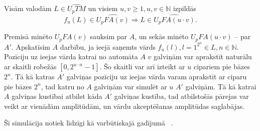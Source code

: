 \documentclass{ludis}
\begin{document}
\begin{lemma} \label{reizinajums}
Visām valodām $L \in \widehat{U_pTM}$ un visiem $u, v \geq 1, u, v \in \mathbb{N}$ izpildās
\[
	f_u(L) \in \widehat{U_pFA(v)} \Rightarrow L \in \widehat{U_pFA(u \cdot v)}.
\]
\end{lemma}
\begin{pieradijums}
Premisā minēto $U_pFA(v)$ sauksim par $A$, un sekās minēto $U_pFA(u \cdot v)$ -- par $A'$. %
Apskatīsim $A$ darbību, ja ieejā saņemts vārds $f_u(l), l = 1^{2^n} \in L, n \in \mathbb{N}$. Pozīciju uz ieejas vārda katrai no automāta $A$ $v$ galviņām var aprakstīt naturālu ar skaitli robežās $\left[0, 2^{u \cdot n} -1 \right]$. Šo skaitli var arī izteikt ar $u$ cipariem pie bāzes $2^n$. Tā kā katras $A'$ galviņas pozīciju uz ieejas vārda varam aprakstīt ar ciparu pie bāzes $2^n$, tad katru no $A$ galviņām var simulēt ar $u$ $A'$ galviņām. Tā kā katrai $A$ galviņas kustībai atbilst kāda $A'$ galviņas kustība, tad atbilstošās pārejas var veikt ar vienādām amplitūdām, un vārdu akceptēšanas amplitūdas saglabājas.

Šī simulācija notiek līdzīgi kā varbūtiskajā gadījumā ~\citep{Macarie1995}. %
\end{pieradijums}
\end{document}
